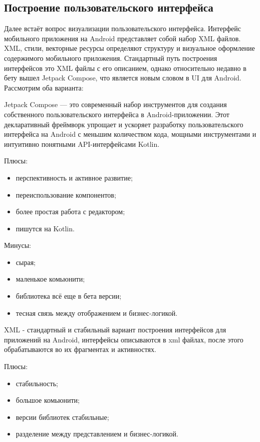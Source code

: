 \subsection{Построение пользовательского интерфейса}
Далее встаёт вопрос визуализации пользовательского интерфейса. Интерфейс мобильного приложения на Android представляет собой набор XML файлов. 
XML, стили, векторные ресурсы определяют структуру и визуальное оформление содержимого мобильного приложения. Стандартный путь построения интерфейсов это XML файлы с его описанием, однако относительно недавно в бету вышел Jetpack Compose, что является новым словом в UI для Android. Рассмотрим оба варианта:

Jetpack Compose — это современный набор инструментов для создания собственного пользовательского интерфейса в Android-приложении. Этот декларативный фреймворк упрощает и ускоряет разработку пользовательского интерфейса на Android с меньшим количеством кода, мощными инструментами и интуитивно понятными API-интерфейсами Kotlin.
 
Плюсы:
\begin{itemize}
 \item перспективность и активное развитие;
 \item переиспользование компонентов;
 \item более простая работа с редактором;
 \item пишутся на Kotlin.
\end{itemize}

Минусы:
\begin{itemize}
 \item сырая;
 \item маленькое комьюнити;
 \item библиотека всё еще в бета версии;
 \item тесная связь между отображением и бизнес-логикой.
\end{itemize}

XML - стандартный и стабильный вариант построения интерфейсов для приложений на Android, интерфейсы описываются в xml файлах, после этого обрабатываются во их фрагментах и активностях.

Плюсы:
\begin{itemize}
 \item стабильность;
 \item большое комьюнити;
 \item версии библиотек стабильные;
 \item разделение между представлением и бизнес-логикой.
\end{itemize}

